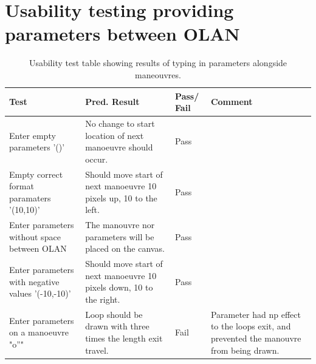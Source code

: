 \section{Usability testing providing parameters between OLAN}
\label{test:parameters}
\begin{table}[h]
\begin{tabular}{|p{4.5cm}|p{4.5cm}|p{2cm}|p{2.5cm}|}
\hline
\textbf{Test} & \textbf{Pred. Result} & \textbf{Pass/ Fail} & \textbf{Comment}                        \\ \hline
Enter empty parameters '()'    &  No change to start location of next manoeuvre should occur.  &     Pass       &     \\ \hline
Empty correct format paramaters '(10,10)'    &  Should move start of next manoeuvre 10 pixels up, 10 to the left.  &      Pass      &     \\ \hline
Enter parameters without space between OLAN    & The manouvre nor parameters will be placed on the canvas.   &        Pass    &     \\ \hline
Enter parameters with negative values '(-10,-10)'    &  Should move start of next manoeuvre 10 pixels down, 10 to the right.  &       Pass     &     \\ \hline
Enter parameters on a manoeuvre "o''"  &  Loop should be drawn with three times the length exit travel.  &        Fail    &   Parameter had np effect to the loops exit, and prevented the manouvre from being drawn.  \\ \hline
\end{tabular}
\caption{Usability test table showing results of typing in parameters alongside maneouvres.}
\end{table}

\clearpage

